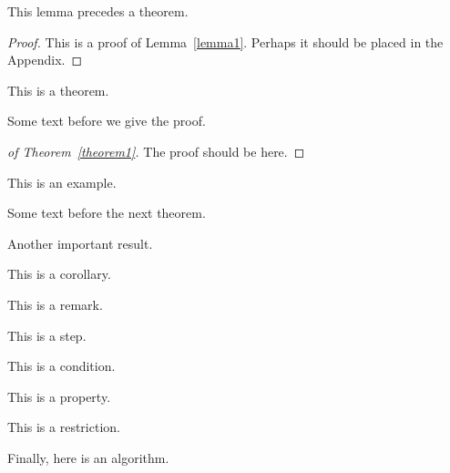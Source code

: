 \documentclass[article,lineno]{biometrika}
\begin{document}
\begin{lemma}
\label{lemma1}
This lemma precedes a theorem.
\end{lemma}

\begin{proof}
This is a proof of Lemma~\ref{lemma1}.  Perhaps it should be placed in the Appendix.
\end{proof}

\begin{theorem}
\label{theorem1}
This is a theorem.
\end{theorem}

Some text before we give the proof.

\begin{proof}[of Theorem~\ref{theorem1}]
The proof should be here.
\end{proof}

\begin{example}
This is an example.
\end{example}

Some text before the next theorem.

\begin{theorem}
Another important result.
\end{theorem}

\begin{corollary}
This is a corollary.
\end{corollary}

\begin{remark}
This is a remark.
\end{remark}

\begin{step}
This is a step.
\end{step}

\begin{condition}
This is a condition.
\end{condition}


\begin{property}
This is a property.
\end{property}

\begin{restriction}
This is a restriction.
\end{restriction}

\begin{algo}
Finally, here is an algorithm.
\end{algo}
\end{document}

